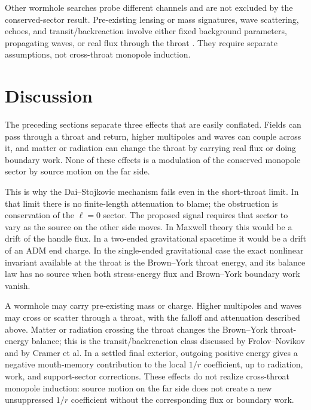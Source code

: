 \documentclass[aps,prd,10pt,onecolumn,nofootinbib,superscriptaddress,floatfix]{revtex4-2}
\begin{document}
Other wormhole searches probe different channels and are not excluded by the
conserved-sector result.  Pre-existing lensing or mass signatures, wave
scattering, echoes, and transit/backreaction involve either fixed
background parameters, propagating waves, or real flux through the throat
\cite{BaoHouZhang2023GWScattering,CramerEtAl1995NaturalWormholes}.  They
require separate assumptions, not cross-throat monopole induction.

\section{Discussion}
\label{sec:discussion}

The preceding sections separate three effects that are easily conflated.
Fields can pass through a throat and return, higher multipoles and waves can
couple across it, and matter or radiation can change the throat by carrying
real flux or doing boundary work.  None of these effects is a modulation of
the conserved monopole sector by source motion on the far side.

This is why the Dai--Stojkovic mechanism fails even in the short-throat limit.
In that limit there is no finite-length attenuation to blame; the obstruction
is conservation of the $\ell=0$ sector.  The proposed signal requires that
sector to vary as the source on the other side moves.  In Maxwell theory this
would be a drift of the handle flux.  In a two-ended gravitational spacetime
it would be a drift of an ADM end charge.  In the single-ended gravitational
case the exact nonlinear invariant available at the throat is the Brown--York
throat energy, and its balance law has no source when both stress-energy flux
and Brown--York boundary work vanish.

A wormhole may carry pre-existing mass or charge.  Higher multipoles and waves
may cross or scatter through a throat, with the falloff and attenuation
described above.  Matter or radiation crossing the throat changes the
Brown--York throat-energy balance; this is the transit/backreaction class
discussed by Frolov--Novikov and by Cramer et al.  In a settled final exterior,
outgoing positive energy gives a negative mouth-memory contribution to the
local $1/r$ coefficient, up to radiation, work, and support-sector corrections.
These effects do not realize cross-throat monopole induction: source motion on
the far side does not create a new unsuppressed $1/r$ coefficient without the
corresponding flux or boundary work.
\end{document}
